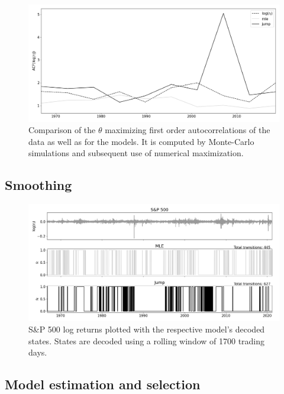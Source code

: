 \begin{figure}[H] 
    \centering
    \includegraphics[width=1.0\textwidth]{analysis/stylized_facts/images/acf_taylor_effect.png}
    \caption{Comparison of the $\theta$ maximizing first order autocorrelations of the data as well as for the models. It is computed by Monte-Carlo simulations and subsequent use of numerical maximization.}
    \label{fig:stylized_facts_taylor_effect} 
\end{figure}

\subsection{Smoothing}

\begin{figure}[H] 
    \centering
    \includegraphics[width=1.0\textwidth]{analysis/stylized_facts/images/decoded_states.png}
    \caption{S\&P 500 log returns plotted with the respective model's decoded states. States are decoded using a rolling window of 1700 trading days.}
    \label{fig:stylized_facts_decoded_states} 
\end{figure}


\subsection{Model estimation and selection}
\label{Subsection: Model estimation and selection}
